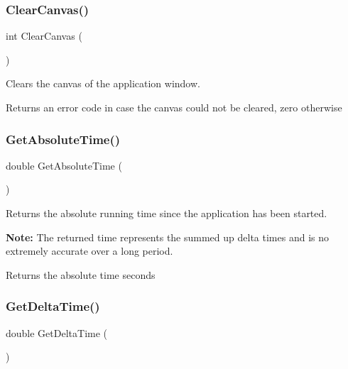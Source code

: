 \subsubsection{\texorpdfstring{Clear\+Canvas()}{ClearCanvas()}}
{\footnotesize\ttfamily int Clear\+Canvas (\begin{DoxyParamCaption}{ }\end{DoxyParamCaption})}

Clears the canvas of the application window.

\begin{DoxyReturn}{Returns}
an error code in case the canvas could not be cleared, zero otherwise 
\end{DoxyReturn}
\mbox{\label{group__sdl__group_ga9b9387d774c6bc63e5e3c6c91296dedb}} 
\subsubsection{\texorpdfstring{Get\+Absolute\+Time()}{GetAbsoluteTime()}}
{\footnotesize\ttfamily double Get\+Absolute\+Time (\begin{DoxyParamCaption}{ }\end{DoxyParamCaption})}

Returns the absolute running time since the application has been started.

{\bfseries Note\+:} The returned time represents the summed up delta times and is no extremely accurate over a long period.

\begin{DoxyReturn}{Returns}
the absolute time seconds 
\end{DoxyReturn}
\mbox{\label{group__sdl__group_gaf9e3349b29171ad58521f5a7a6238fca}} 
\subsubsection{\texorpdfstring{Get\+Delta\+Time()}{GetDeltaTime()}}
{\footnotesize\ttfamily double Get\+Delta\+Time (\begin{DoxyParamCaption}{ }\end{DoxyParamCaption})}

